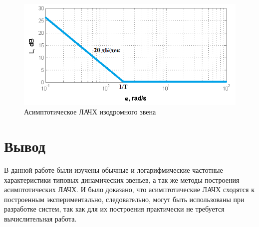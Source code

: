 \documentclass[a4paper, 11pt, russian]{article}
\begin{document}
    \begin{figure}[ht!]
        \centering
        \includegraphics[scale = 0.8]{isodromusLinkAsymp}
        \caption{Асимптотическое ЛАЧХ изодромного звена}
    \end{figure}
    \clearpage
    \section*{Вывод}
    В данной работе были изучены обычные и логарифмические частотные характеристики типовых динамических звеньев, а так же методы построения асимптотических ЛАЧХ. И было доказано, что асимптотические ЛАЧХ сходятся к построенным экспериментально, следовательно, могут быть использованы при разработке систем, так как для их построения практически не требуется вычислительная работа.
\end{document}
